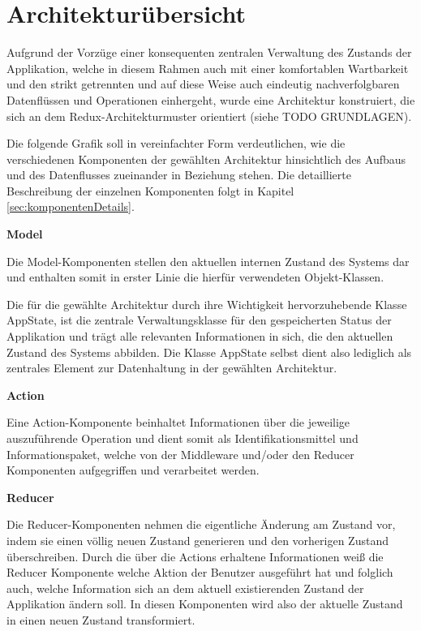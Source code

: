 \documentclass[bibliography=totoc,listof=totoc,BCOR=5mm,DIV=12,oneside]{scrbook}
\begin{document}
\section{Architekturübersicht}
\par Aufgrund der Vorzüge einer konsequenten zentralen Verwaltung des Zustands der Applikation, welche in diesem Rahmen auch mit einer komfortablen Wartbarkeit und den strikt getrennten und auf diese Weise auch eindeutig nachverfolgbaren Datenflüssen und Operationen einhergeht, wurde eine Architektur konstruiert, die sich an dem Redux-Architekturmuster orientiert (siehe TODO GRUNDLAGEN). 
\par Die folgende Grafik soll in vereinfachter Form verdeutlichen, wie die verschiedenen Komponenten der gewählten Architektur hinsichtlich des Aufbaus und des Datenflusses zueinander in Beziehung stehen. Die detaillierte Beschreibung der einzelnen Komponenten folgt in Kapitel \ref{sec:komponentenDetails}.

\par \bigskip \textbf{Model}
\par Die Model-Komponenten stellen den aktuellen internen Zustand des Systems dar und enthalten somit in erster Linie die hierfür verwendeten Objekt-Klassen.
\par Die für die gewählte Architektur durch ihre Wichtigkeit hervorzuhebende Klasse AppState, ist die zentrale Verwaltungsklasse für den gespeicherten Status der Applikation und trägt alle relevanten Informationen in sich, die den aktuellen Zustand des Systems abbilden. Die Klasse AppState selbst dient also lediglich als zentrales Element zur Datenhaltung in der gewählten Architektur.

\par \bigskip \textbf{Action}
\par Eine Action-Komponente beinhaltet Informationen über die jeweilige auszuführende Operation und dient somit als Identifikationsmittel und Informationspaket, welche von der Middleware und/oder den Reducer Komponenten aufgegriffen und verarbeitet werden.

\par \bigskip \textbf{Reducer}
\par Die Reducer-Komponenten nehmen die eigentliche Änderung am Zustand vor, indem sie einen völlig neuen Zustand generieren und den vorherigen Zustand überschreiben. Durch die über die Actions erhaltene Informationen weiß die Reducer Komponente welche Aktion der Benutzer ausgeführt hat und folglich auch, welche Information sich an dem aktuell existierenden Zustand der Applikation ändern soll. In diesen Komponenten wird also der aktuelle Zustand in einen neuen Zustand transformiert.
\end{document}
